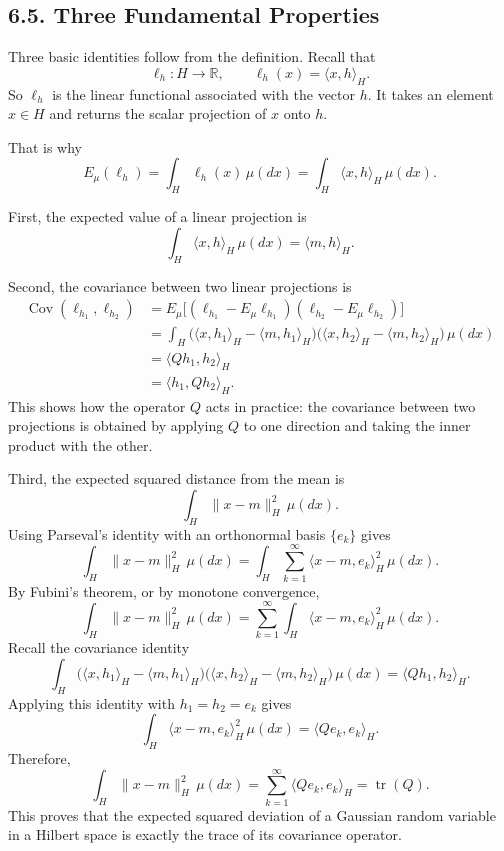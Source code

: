 \documentclass[11pt]{article}
\theoremstyle{definition}
\theoremstyle{remark}
\begin{document}
\subsection*{6.5. Three Fundamental Properties}
Three basic identities follow from the definition.
Recall that
\[
\ell_h:H\to\mathbb R,\qquad \ell_h(x)=\langle x,h\rangle_H.
\]
So $\ell_h$ is the linear functional associated with the vector $h$. It takes an element $x\in H$ and returns the scalar projection of $x$ onto $h$.

That is why
\[
E_\mu(\ell_h)
=
\int_H \ell_h(x)\,\mu(dx)
=
\int_H \langle x,h\rangle_H\,\mu(dx).
\]

First, the expected value of a linear projection is
\[
\int_H \langle x,h\rangle_H\,\mu(dx)=\langle m,h\rangle_H.
\]

Second, the covariance between two linear projections is
\begin{align*}
\operatorname{Cov}(\ell_{h_1},\ell_{h_2})
&=
E_\mu\bigl[(\ell_{h_1}-E_\mu\ell_{h_1})(\ell_{h_2}-E_\mu\ell_{h_2})\bigr] \\
&=
\int_H
\bigl(\langle x,h_1\rangle_H-\langle m,h_1\rangle_H\bigr)
\bigl(\langle x,h_2\rangle_H-\langle m,h_2\rangle_H\bigr)\,\mu(dx) \\
&=
\langle Qh_1,h_2\rangle_H \\
&=
\langle h_1,Qh_2\rangle_H.
\end{align*}
This shows how the operator $Q$ acts in practice: the covariance between two projections is obtained by applying $Q$ to one direction and taking the inner product with the other.

Third, the expected squared distance from the mean is
\[
\int_H \|x-m\|_H^2\,\mu(dx).
\]
Using Parseval's identity with an orthonormal basis $\{e_k\}$ gives
\[
\int_H \|x-m\|_H^2\,\mu(dx)
=
\int_H \sum_{k=1}^{\infty}\langle x-m,e_k\rangle_H^2\,\mu(dx).
\]
By Fubini's theorem, or by monotone convergence,
\[
\int_H \|x-m\|_H^2\,\mu(dx)
=
\sum_{k=1}^{\infty}\int_H \langle x-m,e_k\rangle_H^2\,\mu(dx).
\]
Recall the covariance identity
\[
\int_H
\bigl(\langle x,h_1\rangle_H-\langle m,h_1\rangle_H\bigr)
\bigl(\langle x,h_2\rangle_H-\langle m,h_2\rangle_H\bigr)\,\mu(dx)
=
\langle Qh_1,h_2\rangle_H.
\]
Applying this identity with $h_1=h_2=e_k$ gives
\[
\int_H \langle x-m,e_k\rangle_H^2\,\mu(dx)=\langle Qe_k,e_k\rangle_H.
\]
Therefore,
\[
\int_H \|x-m\|_H^2\,\mu(dx)
=
\sum_{k=1}^{\infty}\langle Qe_k,e_k\rangle_H
=
\operatorname{tr}(Q).
\]
This proves that the expected squared deviation of a Gaussian random variable in a Hilbert space is exactly the trace of its covariance operator.
\end{document}

